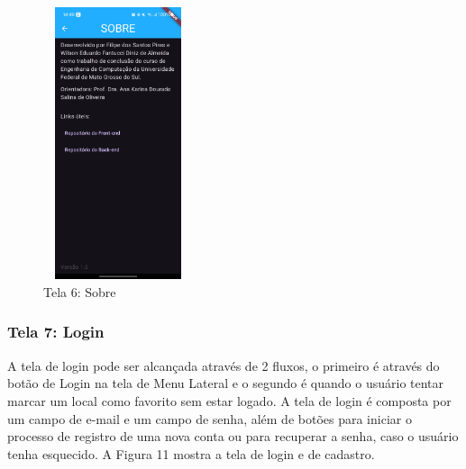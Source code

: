     \begin{figure}[h]
        \centering
        \includegraphics[width=44mm,height=80mm]{imagens/sobre.jpg}
        \caption{\scriptsize Tela 6: Sobre}
        \label{fig:tela6}
    \end{figure}

    \FloatBarrier

\subsubsection{Tela 7: Login}

    A tela de login pode ser alcançada através de 2 fluxos, o primeiro é através do botão de Login na tela de Menu Lateral e o segundo é quando o usuário tentar marcar um local como favorito sem estar logado. A tela de login é composta por um campo de e-mail e um campo de senha, além de botões para iniciar o processo de registro de uma nova conta ou para recuperar a senha, caso o usuário tenha esquecido. A Figura 11 mostra a tela de login e de cadastro.

